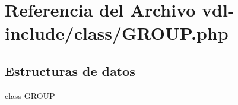 \hypertarget{GROUP_8php}{\section{Referencia del Archivo vdl-\/include/class/\-G\-R\-O\-U\-P.php}
\label{GROUP_8php}
}
\subsection*{Estructuras de datos}
\begin{DoxyCompactItemize}
\item 
class \hyperlink{classGROUP}{G\-R\-O\-U\-P}
\end{DoxyCompactItemize}
